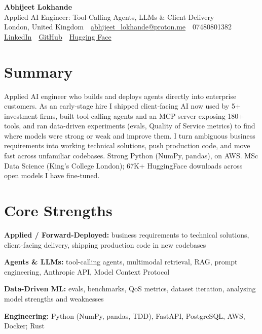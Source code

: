 \documentclass[10pt,a4paper]{article}
\newcommand{\sep}{\,\textcolor{accent!60}{\textbar}\,}
\begin{document}
\begin{center}
  {\fontsize{24}{26}\selectfont\bfseries Abhijeet Lokhande}\\[3pt]
  {\color{accent}\large Applied AI Engineer: Tool-Calling Agents, LLMs \& Client Delivery}\\[5pt]
  {\small
    London, United Kingdom \sep
    \href{mailto:abhijeet_lokhande@proton.me}{abhijeet\_lokhande@proton.me} \sep
    07480801382 \\[2pt]
    \href{https://www.linkedin.com/in/ablds/}{LinkedIn} \sep
    \href{https://github.com/abhijeetscode}{GitHub} \sep
    \href{https://huggingface.co/ab-ai}{Hugging Face}
  }
\end{center}
\vspace{2pt}

\section{Summary}
Applied AI engineer who builds and deploys agents directly into enterprise customers. As an early-stage hire I shipped client-facing AI now used by 5+ investment firms, built tool-calling agents and an MCP server exposing 180+ tools, and ran data-driven experiments (evals, Quality of Service metrics) to find where models were strong or weak and improve them. I turn ambiguous business requirements into working technical solutions, push production code, and move fast across unfamiliar codebases. Strong Python (NumPy, pandas), on AWS. MSc Data Science (King's College London); 67K+ HuggingFace downloads across open models I have fine-tuned.

\section{Core Strengths}
\begin{tight}
  \item[\textcolor{accent}{\small$\bullet$}] \textbf{Applied / Forward-Deployed:} business requirements to technical solutions, client-facing delivery, shipping production code in new codebases
  \item[\textcolor{accent}{\small$\bullet$}] \textbf{Agents \& LLMs:} tool-calling agents, multimodal retrieval, RAG, prompt engineering, Anthropic API, Model Context Protocol
  \item[\textcolor{accent}{\small$\bullet$}] \textbf{Data-Driven ML:} evals, benchmarks, QoS metrics, dataset iteration, analysing model strengths and weaknesses
  \item[\textcolor{accent}{\small$\bullet$}] \textbf{Engineering:} Python (NumPy, pandas, TDD), FastAPI, PostgreSQL, AWS, Docker; Rust
\end{tight}
\end{document}
